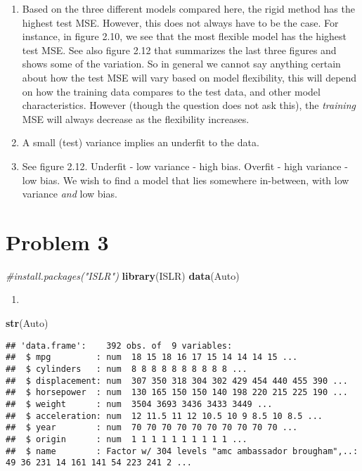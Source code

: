 \documentclass[
]{article}
\newenvironment{Shaded}{\begin{snugshade}}{\end{snugshade}}
\newcommand{\CommentTok}[1]{\textcolor[rgb]{0.56,0.35,0.01}{\textit{#1}}}
\newcommand{\FunctionTok}[1]{\textcolor[rgb]{0.13,0.29,0.53}{\textbf{#1}}}
\newcommand{\NormalTok}[1]{#1}
\providecommand{\tightlist}{%
  \setlength{\itemsep}{0pt}\setlength{\parskip}{0pt}}
\begin{document}
\begin{enumerate}
\def\labelenumi{\alph{enumi})}
\tightlist
\item
  Based on the three different models compared here, the rigid method
  has the highest test MSE. However, this does not always have to be the
  case. For instance, in figure 2.10, we see that the most flexible
  model has the highest test MSE. See also figure 2.12 that summarizes
  the last three figures and shows some of the variation. So in general
  we cannot say anything certain about how the test MSE will vary based
  on model flexibility, this will depend on how the training data
  compares to the test data, and other model characteristics. However
  (though the question does not ask this), the \emph{training} MSE will
  always decrease as the flexibility increases.
\item
  A small (test) variance implies an underfit to the data.
\item
  See figure 2.12. Underfit - low variance - high bias. Overfit - high
  variance - low bias. We wish to find a model that lies somewhere
  in-between, with low variance \emph{and} low bias.
\end{enumerate}

\section{Problem 3}\label{problem-3}

\begin{Shaded}
\begin{Highlighting}[]
\CommentTok{\#install.packages("ISLR")}
\FunctionTok{library}\NormalTok{(ISLR)}
\FunctionTok{data}\NormalTok{(Auto)}
\end{Highlighting}
\end{Shaded}

\begin{enumerate}
\def\labelenumi{\alph{enumi})}
\tightlist
\item
\end{enumerate}

\begin{Shaded}
\begin{Highlighting}[]
\FunctionTok{str}\NormalTok{(Auto)}
\end{Highlighting}
\end{Shaded}

\begin{verbatim}
## 'data.frame':    392 obs. of  9 variables:
##  $ mpg         : num  18 15 18 16 17 15 14 14 14 15 ...
##  $ cylinders   : num  8 8 8 8 8 8 8 8 8 8 ...
##  $ displacement: num  307 350 318 304 302 429 454 440 455 390 ...
##  $ horsepower  : num  130 165 150 150 140 198 220 215 225 190 ...
##  $ weight      : num  3504 3693 3436 3433 3449 ...
##  $ acceleration: num  12 11.5 11 12 10.5 10 9 8.5 10 8.5 ...
##  $ year        : num  70 70 70 70 70 70 70 70 70 70 ...
##  $ origin      : num  1 1 1 1 1 1 1 1 1 1 ...
##  $ name        : Factor w/ 304 levels "amc ambassador brougham",..: 49 36 231 14 161 141 54 223 241 2 ...
\end{verbatim}
\end{document}
